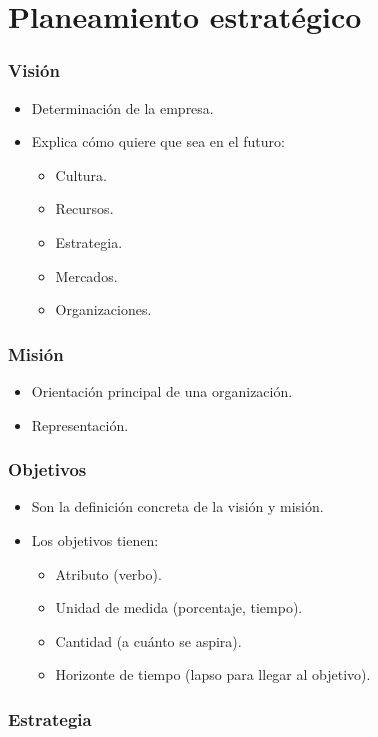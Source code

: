\documentclass[12pt, spanish, a5paper]{article}
\begin{document}
\part{Planeamiento estratégico}

\section{Visión}
	\begin{itemize}
		\item Determinación de la empresa.
		\item Explica cómo quiere que sea en el futuro:
		\begin{itemize}
			\item Cultura.
			\item Recursos.
			\item Estrategia.
			\item Mercados.
			\item Organizaciones.
		\end{itemize}
	\end{itemize}

\section{Misión}
\begin{itemize}
	\item Orientación principal de una organización.
	\item Representación.
\end{itemize}

\section{Objetivos}
\begin{itemize}
	\item Son la definición concreta de la visión y misión.
	\item Los objetivos tienen:
	\begin{itemize}
		\item Atributo (verbo).
		\item Unidad de medida (porcentaje, tiempo).
		\item Cantidad (a cuánto se aspira).
		\item Horizonte de tiempo (lapso para llegar al objetivo).
	\end{itemize}
\end{itemize}

\section{Estrategia}
\end{document}
